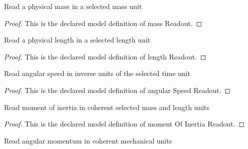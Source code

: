 \begin{definition}
  \label{def:physics:phyx-mini-0582:phyxminiproblems-problemphyxmini0582-massreadout}
  Read a physical mass in a selected mass unit
\end{definition}
\begin{proof}
  This is the declared model definition of mass Readout.
\end{proof}
\begin{definition}
  \label{def:physics:phyx-mini-0582:phyxminiproblems-problemphyxmini0582-lengthreadout}
  Read a physical length in a selected length unit
\end{definition}
\begin{proof}
  This is the declared model definition of length Readout.
\end{proof}
\begin{definition}
  \label{def:physics:phyx-mini-0582:phyxminiproblems-problemphyxmini0582-angularspeedreadout}
  Read angular speed in inverse units of the selected time unit
\end{definition}
\begin{proof}
  This is the declared model definition of angular Speed Readout.
\end{proof}
\begin{definition}
  \label{def:physics:phyx-mini-0582:phyxminiproblems-problemphyxmini0582-momentofinertiareadout}
  Read moment of inertia in coherent selected mass and length units
\end{definition}
\begin{proof}
  This is the declared model definition of moment Of Inertia Readout.
\end{proof}
\begin{definition}
  \label{def:physics:phyx-mini-0582:phyxminiproblems-problemphyxmini0582-angularmomentumreadout}
  Read angular momentum in coherent mechanical units
\end{definition}

